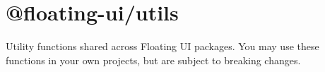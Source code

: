 \chapter{@floating-\/ui/utils}
\hypertarget{md__2home_2solype_2delivery_2current__days_2Mannheim_2front_2node__modules_2_0dfloating-ui_2utils_2README}{}\label{md__2home_2solype_2delivery_2current__days_2Mannheim_2front_2node__modules_2_0dfloating-ui_2utils_2README}
\label{md__2home_2solype_2delivery_2current__days_2Mannheim_2front_2node__modules_2_0dfloating-ui_2utils_2README_autotoc_md279}%
%
 Utility functions shared across Floating UI packages. You may use these functions in your own projects, but are subject to breaking changes. 